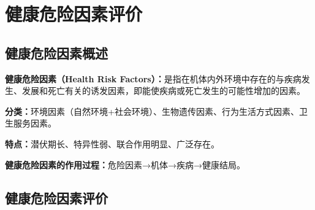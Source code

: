 \chapter{健康危险因素评价}
\setcounter{chapter}{11}

\section{健康危险因素概述}

\begin{defbox}
\textbf{健康危险因素（Health Risk Factors）：}是指在机体内外环境中存在的与疾病发生、发展和死亡有关的诱发因素，即能使疾病或死亡发生的可能性增加的因素。

\textbf{分类：}环境因素（自然环境+社会环境）、生物遗传因素、行为生活方式因素、卫生服务因素。

\textbf{特点：}潜伏期长、特异性弱、联合作用明显、广泛存在。

\textbf{健康危险因素的作用过程：}危险因素→机体→疾病→健康结局。
\end{defbox}

\section{健康危险因素评价}

